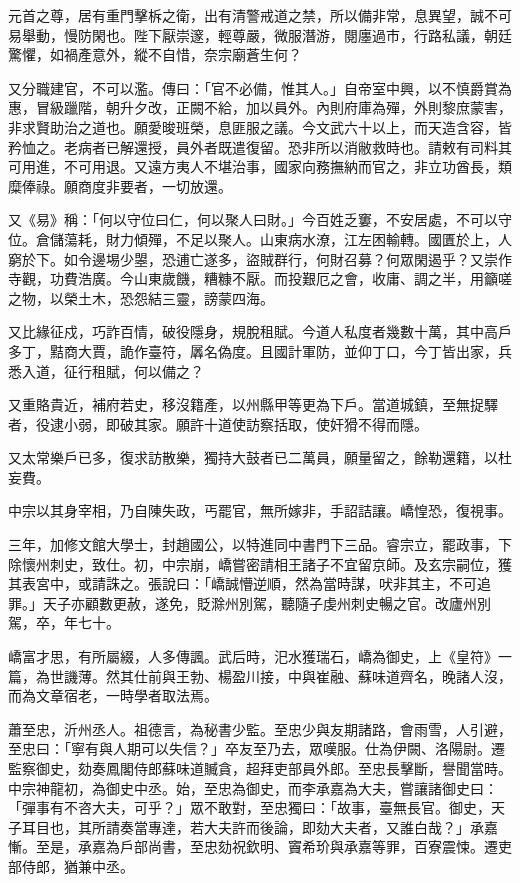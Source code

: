 \begin{pinyinscope}
 元首之尊，居有重門擊柝之衛，出有清警戒道之禁，所以備非常，息異望，誠不可易舉動，慢防閑也。陛下厭崇邃，輕尊嚴，微服潛游，閱廛過市，行路私議，朝廷驚懼，如禍產意外，縱不自惜，奈宗廟蒼生何？



 又分職建官，不可以濫。傳曰：「官不必備，惟其人。」自帝室中興，以不慎爵賞為惠，冒級躐階，朝升夕改，正闕不給，加以員外。內則府庫為殫，外則黎庶蒙害，非求賢助治之道也。願愛晙班榮，息匪服之議。今文武六十以上，而天造含容，皆矜恤之。老病者已解還授，員外者既遣復留。恐非所以消敝救時也。請敕有司料其可用進，不可用退。又遠方夷人不堪治事，國家向務撫納而官之，非立功酋長，類糜俸祿。願商度非要者，一切放還。



 又《易》稱：「何以守位曰仁，何以聚人曰財。」今百姓乏窶，不安居處，不可以守位。倉儲蕩耗，財力傾殫，不足以聚人。山東病水潦，江左困輸轉。國匱於上，人窮於下。如令邊埸少曌，恐逋亡遂多，盜賊群行，何財召募？何眾閑遏乎？又崇作寺觀，功費浩廣。今山東歲饑，糟糠不厭。而投艱厄之會，收庸、調之半，用籲嗟之物，以榮土木，恐怨結三靈，謗蒙四海。



 又比緣征戍，巧詐百情，破役隱身，規脫租賦。今道人私度者幾數十萬，其中高戶多丁，黠商大賈，詭作臺符，羼名偽度。且國計軍防，並仰丁口，今丁皆出家，兵悉入道，征行租賦，何以備之？



 又重賂貴近，補府若史，移沒籍產，以州縣甲等更為下戶。當道城鎮，至無捉驛者，役逮小弱，即破其家。願許十道使訪察括取，使奸猾不得而隱。



 又太常樂戶已多，復求訪散樂，獨持大鼓者已二萬員，願量留之，餘勒還籍，以杜妄費。



 中宗以其身宰相，乃自陳失政，丐罷官，無所嫁非，手詔詰讓。嶠惶恐，復視事。



 三年，加修文館大學士，封趙國公，以特進同中書門下三品。睿宗立，罷政事，下除懷州刺史，致仕。初，中宗崩，嶠嘗密請相王諸子不宜留京師。及玄宗嗣位，獲其表宮中，或請誅之。張說曰：「嶠誠懵逆順，然為當時謀，吠非其主，不可追罪。」天子亦顧數更赦，遂免，貶滁州別駕，聽隨子虔州刺史暢之官。改廬州別駕，卒，年七十。



 嶠富才思，有所屬綴，人多傳諷。武后時，汜水獲瑞石，嶠為御史，上《皇符》一篇，為世譏薄。然其仕前與王勃、楊盈川接，中與崔融、蘇味道齊名，晚諸人沒，而為文章宿老，一時學者取法焉。



 蕭至忠，沂州丞人。祖德言，為秘書少監。至忠少與友期諸路，會雨雪，人引避，至忠曰：「寧有與人期可以失信？」卒友至乃去，眾嘆服。仕為伊闕、洛陽尉。遷監察御史，劾奏鳳閣侍郎蘇味道贓貪，超拜吏部員外郎。至忠長擊斷，譽聞當時。中宗神龍初，為御史中丞。始，至忠為御史，而李承嘉為大夫，嘗讓諸御史曰：「彈事有不咨大夫，可乎？」眾不敢對，至忠獨曰：「故事，臺無長官。御史，天子耳目也，其所請奏當專達，若大夫許而後論，即劾大夫者，又誰白哉？」承嘉慚。至是，承嘉為戶部尚書，至忠劾祝欽明、竇希玠與承嘉等罪，百寮震悚。遷吏部侍郎，猶兼中丞。




\end{pinyinscope}

